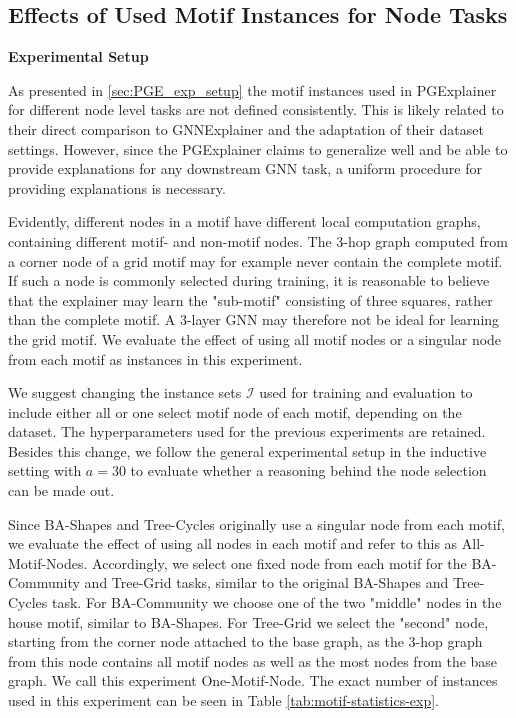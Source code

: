 \subsection{Effects of Used Motif Instances for Node Tasks}
\label{sec:motif_set_experiment}

\textbf{Experimental Setup} \par
As presented in \ref{sec:PGE_exp_setup} the motif instances used in PGExplainer \cite{luo2020parameterized} for different node level tasks are not defined consistently. This is likely related to their direct comparison to GNNExplainer \cite{ying2019gnnexplainer} and the adaptation of their dataset settings. However, since the PGExplainer claims to generalize well and be able to provide explanations for any downstream GNN task, a uniform procedure for providing explanations is necessary. 

Evidently, different nodes in a motif have different local computation graphs, containing different motif- and non-motif nodes. The 3-hop graph computed from a corner node of a grid motif may for example never contain the complete motif. If such a node is commonly selected during training, it is reasonable to believe that the explainer may learn the "sub-motif" consisting of three squares, rather than the complete motif. A 3-layer GNN may therefore not be ideal for learning the grid motif. We evaluate the effect of using all motif nodes or a singular node from each motif as instances in this experiment.

We suggest changing the instance sets $\mathcal{I}$ used for training and evaluation to include either all or one select motif node of each motif, depending on the dataset. The hyperparameters used for the previous experiments are retained. Besides this change, we follow the general experimental setup in the inductive setting with $a=30$ to evaluate whether a reasoning behind the node selection can be made out. \bigskip

Since BA-Shapes and Tree-Cycles originally use a singular node from each motif, we evaluate the effect of using all nodes in each motif and refer to this as All-Motif-Nodes. Accordingly, we select one fixed node from each motif for the BA-Community and Tree-Grid tasks, similar to the original BA-Shapes and Tree-Cycles task. For BA-Community we choose one of the two "middle" nodes in the house motif, similar to BA-Shapes. For Tree-Grid we select the "second" node, starting from the corner node attached to the base graph, as the 3-hop graph from this node contains all motif nodes as well as the most nodes from the base graph. We call this experiment One-Motif-Node. The exact number of instances used in this experiment can be seen in Table \ref{tab:motif-statistics-exp}.

